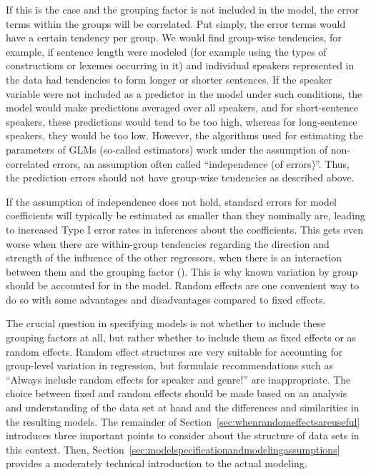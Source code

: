 If this is the case and the grouping factor is not included in the model, the error terms within the groups will be correlated.
Put simply, the error terms would have a certain tendency per group.
We would find group-wise tendencies, for example, if sentence length were modeled (for example using the types of constructions or lexemes occurring in it) and individual speakers represented in the data had tendencies to form longer or shorter sentences.
If the speaker variable were not included as a predictor in the model under such conditions, the model would make predictions averaged over all speakers, and for short-sentence speakers, these predictions would tend to be too high, whereas for long-sentence speakers, they would be too low.
However, the algorithms used for estimating the parameters of GLMs (so-called estimators) work under the assumption of non-correlated errors, an assumption often called ``independence (of errors)''.
Thus, the prediction errors should not have group-wise tendencies as described above.

If the assumption of independence does not hold, standard errors for model coefficients will typically be estimated as smaller than they nominally are, leading to increased Type I error rates in inferences about the coefficients.
This gets even worse when there are within-group tendencies regarding the direction and strength of the influence of the other regressors, \ie when there is an interaction between them and the grouping factor (\eg \citealt{SchielzethForstmeier2009}).
This is why known variation by group should be accounted for in the model.
Random effects are one convenient way to do so with some advantages and disadvantages compared to fixed effects.

The crucial question in specifying models is not whether to include these grouping factors at all, but rather whether to include them as fixed effects or as random effects.
Random effect structures are very suitable for accounting for group-level variation in regression, but formulaic recommendations such as ``Always include random effects for speaker and genre!'' are inappropriate.
The choice between fixed and random effects should be made based on an analysis and understanding of the data set at hand and the differences and similarities in the resulting models.
The remainder of Section~\ref{sec:whenrandomeffectsareuseful} introduces three important points to consider about the structure of data sets in this context.
Then, Section~\ref{sec:modelspecificationandmodelingassumptions} provides a moderately technical introduction to the actual modeling.


